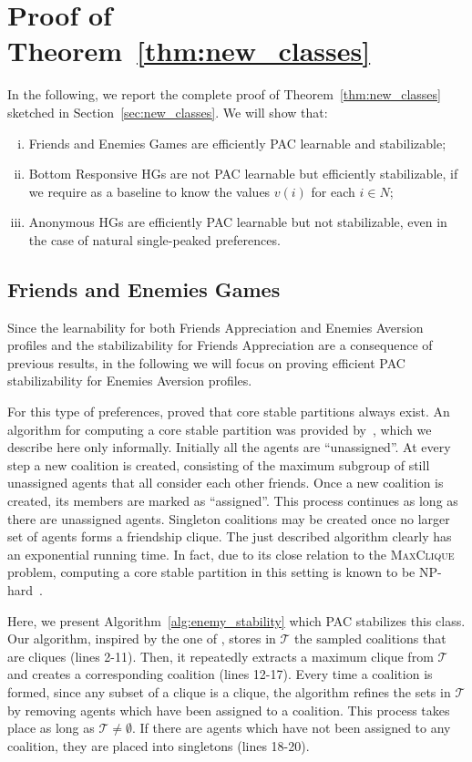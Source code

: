\documentclass[letterpaper]{article} %
\begin{document}
\section{Proof of Theorem~\ref{thm:new_classes}}\label{apx:new_classes}
In the following, we report the complete proof of Theorem~\ref{thm:new_classes} sketched in Section~\ref{sec:new_classes}. We will show that:
\begin{enumerate}[(i)]
\item Friends and Enemies Games are efficiently PAC learnable and stabilizable;
\item Bottom Responsive HGs are not PAC learnable but efficiently stabilizable, if we require as a baseline to know the values $v(i)$ for each $i \in N$;
\item Anonymous HGs are efficiently PAC learnable but not stabilizable, even in the case of natural single-peaked preferences.
\end{enumerate}
\subsection{Friends and Enemies Games}
Since the learnability for both Friends Appreciation and Enemies Aversion profiles and the stabilizability for Friends Appreciation are a consequence of previous results, in the following we will focus on proving efficient PAC stabilizability for Enemies Aversion profiles.

For this type of preferences, \citet{DimitrovBHS06} proved that core stable partitions always exist. An algorithm for computing a core stable partition was provided by~\citet{DimitrovS04}, which we describe here only informally. Initially all the agents are ``unassigned''. At every step a new coalition is created, consisting of the maximum subgroup of still unassigned agents that all consider each other friends. Once a new coalition is created, its members are marked as ``assigned''. This process continues as long as there are unassigned agents. Singleton coalitions may be created once no larger set of agents forms a friendship clique. The just described algorithm clearly has an exponential running time. In fact, due to its close relation to the \textsc{MaxClique} problem, computing a core stable partition in this setting is known to be NP-hard~\cite{DimitrovBHS06}.

Here, we present Algorithm~\ref{alg:enemy_stability} which PAC stabilizes this class.
Our algorithm, inspired by the one of \citet{DimitrovS04}, stores in $\mathcal{T}$ the sampled coalitions that are cliques (lines 2-11). Then, it repeatedly extracts a maximum clique from $\mathcal{T}$ and creates a corresponding coalition (lines 12-17). Every time a coalition is formed, since any subset of a clique is a clique, the algorithm refines the sets in $\mathcal{T}$ by removing agents which have been assigned to a coalition. This process takes place as long as $\mathcal{T}\neq\emptyset$. If there are agents which have not been assigned to any coalition, they are placed into singletons (lines 18-20).
\end{document}

